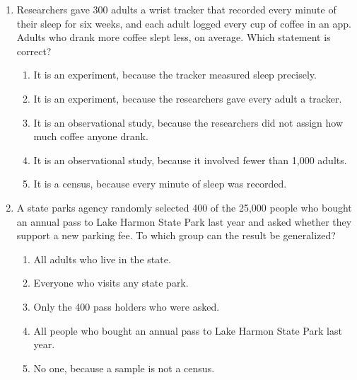 \documentclass[12pt]{article}
\begin{document}
\begin{enumerate}[leftmargin=1.9em, itemsep=0.13in]

  \boxguard[11]
  \item Researchers gave 300 adults a wrist tracker that recorded every minute of their sleep for
        six weeks, and each adult logged every cup of coffee in an app. Adults who drank more
        coffee slept less, on average. Which statement is correct?
        \begin{enumerate}[label=\textbf{(\Alph*)}, leftmargin=2.2em, itemsep=2pt]
          \item It is an experiment, because the tracker measured sleep precisely.
          \item It is an experiment, because the researchers gave every adult a tracker.
          \item It is an observational study, because the researchers did not assign how much coffee anyone drank.
          \item It is an observational study, because it involved fewer than 1{,}000 adults.
          \item It is a census, because every minute of sleep was recorded.\hfill{}\rule[-0.2in]{0pt}{0.48in}
        \end{enumerate}

  \boxguard[11]
  \item A state parks agency randomly selected 400 of the 25{,}000 people who bought an annual
        pass to Lake Harmon State Park last year and asked whether they support a new parking
        fee. To which group can the result be generalized?
        \begin{enumerate}[label=\textbf{(\Alph*)}, leftmargin=2.2em, itemsep=2pt]
          \item All adults who live in the state.
          \item Everyone who visits any state park.
          \item Only the 400 pass holders who were asked.
          \item All people who bought an annual pass to Lake Harmon State Park last year.
          \item No one, because a sample is not a census.\hfill{}\rule[-0.2in]{0pt}{0.48in}
        \end{enumerate}


\end{enumerate}
\end{document}
